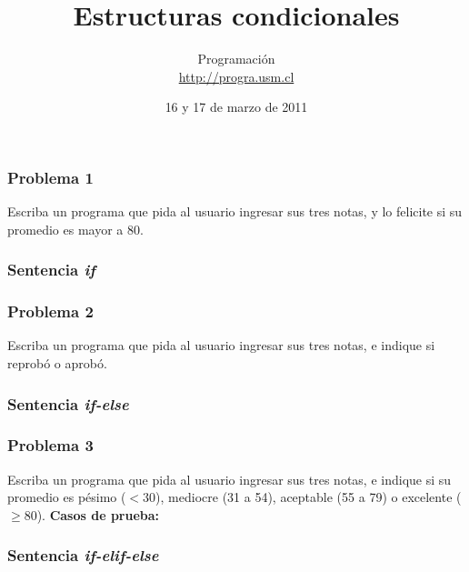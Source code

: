 \documentclass[12pt]{beamer}
\title{Estructuras condicionales}
\author{
  Programación \\ \url{http://progra.usm.cl}
}
\date{16 y 17 de marzo de 2011}
\begin{document}
  \begin{frame}
    \maketitle
  \end{frame}

  \begin{frame}
    \frametitle{Problema 1}
    \label{problema-if}
    Escriba un programa que pida al usuario
    ingresar sus tres notas,
    y lo felicite si su promedio es mayor a 80.
    \vfill
    
    
  \end{frame}

  \begin{frame}
    \frametitle{Sentencia \emph{if}}
    \label{solucion-if}
    
  \end{frame}

  \begin{frame}
    \frametitle{Problema 2}
    \label{problema-if-else}
    Escriba un programa que pida al usuario
    ingresar sus tres notas,
    e indique si reprobó o aprobó.
    \vfill
    
    
  \end{frame}

  \begin{frame}
    \frametitle{Sentencia \emph{if-else}}
    \label{solucion-if-else}
    
  \end{frame}

  \begin{frame}
    \frametitle{Problema 3}
    \label{problema-if-elif}
    Escriba un programa que pida al usuario
    ingresar sus tres notas,
    e indique si su promedio
    es pésimo (\(<30\)),  mediocre (31 a 54),
    aceptable (55 a 79) o excelente (\(\ge 80\)).
    \vfill
    \textbf{Casos de prueba:}\\
    
    
  \end{frame}

  \begin{frame}
    \frametitle{Sentencia \emph{if-elif-else}}
    \label{solucion-if-elif}
    
  \end{frame}
\end{document}
